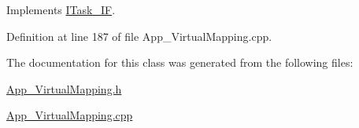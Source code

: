 Implements \mbox{\hyperlink{class_i_task___i_f_af5f8fba86704c7e36d0e4681d58300c6}{I\+Task\+\_\+\+IF}}.



Definition at line 187 of file App\+\_\+\+Virtual\+Mapping.\+cpp.



The documentation for this class was generated from the following files\+:\begin{DoxyCompactItemize}
\item 
\mbox{\hyperlink{_app___virtual_mapping_8h}{App\+\_\+\+Virtual\+Mapping.\+h}}\item 
\mbox{\hyperlink{_app___virtual_mapping_8cpp}{App\+\_\+\+Virtual\+Mapping.\+cpp}}\end{DoxyCompactItemize}
